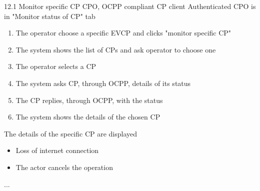 \usecase
{

}
{12.1}
{Monitor specific CP} %
{CPO, OCPP compliant CP client} %
{Authenticated CPO is in "Monitor status of CP" tab} %
{ %
    \begin{enumerate}
        \item The operator choose a specific EVCP and clicks "monitor specific CP"
        \item The system shows the list of CPs and ask operator to choose one
        \item The operator selects a CP
        \item The system asks CP, through OCPP, details of its status
        \item The CP replies, through OCPP, with the status
        \item The system shows the details of the chosen CP
    \end{enumerate}
}
{The details of the specific CP are displayed} %
{ %
    \begin{itemize}
        \item Loss of internet connection
        \item The actor cancels the operation
    \end{itemize}
}
{ %
    ...
}

